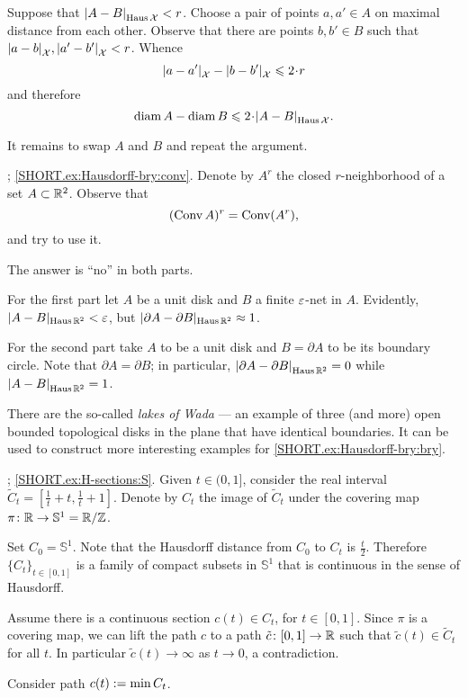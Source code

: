 Suppose that $\dist{A}{B}{\Haus\spc{X}}<r$.
Choose a pair of points $a,a'\in A$ on maximal distance from each other.
Observe that there are points $b,b'\in B$ such that 
$\dist{a}{b}{\spc{X}},\dist{a'}{b'}{\spc{X}}<r$.
Whence 
\[\dist{a}{a'}{\spc{X}}-\dist{b}{b'}{\spc{X}}\le 2\cdot r\]
and therefore
\[\diam A-\diam B\le 2\cdot\dist{A}{B}{\Haus\spc{X}}.\]

It remains to swap $A$ and $B$ and repeat the argument.


\parbf{\ref{ex:Hausdorff-bry}}; \ref{SHORT.ex:Hausdorff-bry:conv}.
Denote by $A^r$ the closed $r$-neighborhood of a set $A\z\subset \RR^2$.
Observe  that 
\[(\mathop{\rm Conv}\nolimits A)^r=\mathop{\rm Conv}\nolimits(A^r),\]
and try to use it.

The answer is ``no'' in both parts.

For the first part let $A$ be a unit disk and $B$ a finite $\varepsilon$-net in $A$.
Evidently, $|A-B|_{\operatorname{\rm Haus}\nolimits\mathbb{R}^2}<\varepsilon$, 
but
$|\partial A-\partial B|_{\operatorname{\rm Haus}\nolimits\mathbb{R}^2}\approx 1$.

For the second part take $A$ to be a unit disk and $B=\partial A$ to be its boundary circle.
Note that $\partial A=\partial B$; in particular, $\dist{\partial A}{\partial B}{\Haus\RR^2}=0$ while $\dist{ A}{B}{\Haus\RR^2}=1$.

There are the so-called {}\emph{lakes of Wada} --- an example of three (and more) open bounded topological disks in the plane that have identical boundaries.
It can be used to construct more interesting examples for \ref{SHORT.ex:Hausdorff-bry:bry}.

\parbf{\ref{ex:H-sections}};
\ref{SHORT.ex:H-sections:S}.
Given $t\in (0,1]$, consider the real interval $\tilde C_t=[\tfrac 1t+t, \tfrac 1t+1]$.
Denote by $C_t$ the image of $\tilde C_t$ under the covering map $\pi\:\RR\to \mathbb{S}^1\z=\RR/\ZZ$.

Set $C_0=\mathbb{S}^1$.
Note that the Hausdorff distance from $C_0$ to $C_t$ is $\tfrac t2$.
Therefore $\{C_t\}_{t\in[0,1]}$ is a family of compact subsets in $\mathbb{S}^1$ that is continuous in the sense of Hausdorff.

Assume there is a continuous section $c(t)\in C_t$, for $t\in [0,1]$.
Since $\pi$ is a covering map,
we can lift the path $c$ to a path $\tilde c\colon[0,1]\to \mathbb{R}$ such that $\tilde c(t)\in \tilde C_t$ for all $t$.
In particular $\tilde c(t)\to\infty$ as $t\to0$,
a contradiction.

Consider path $c(t)\mathrel{:=}\min C_t$.

